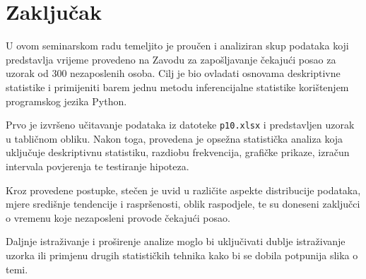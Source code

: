 \section{Zaključak}

U ovom seminarskom radu temeljito je proučen i analiziran skup podataka koji predstavlja vrijeme provedeno na Zavodu za zapošljavanje čekajući posao za uzorak od 300 nezaposlenih osoba. Cilj je bio ovladati osnovama deskriptivne statistike i primijeniti barem jednu metodu inferencijalne statistike korištenjem programskog jezika Python.

Prvo je izvršeno učitavanje podataka iz datoteke \texttt{p10.xlsx} i predstavljen uzorak u tabličnom obliku. Nakon toga, provedena je opsežna statistička analiza koja uključuje deskriptivnu statistiku, razdiobu frekvencija, grafičke prikaze, izračun intervala povjerenja te testiranje hipoteza.

Kroz provedene postupke, stečen je uvid u različite aspekte distribucije podataka, mjere središnje tendencije i raspršenosti, oblik raspodjele, te su doneseni zaključci o vremenu koje nezaposleni provode čekajući posao.

Daljnje istraživanje i proširenje analize moglo bi uključivati dublje istraživanje uzorka ili primjenu drugih statističkih tehnika kako bi se dobila potpunija slika o temi.